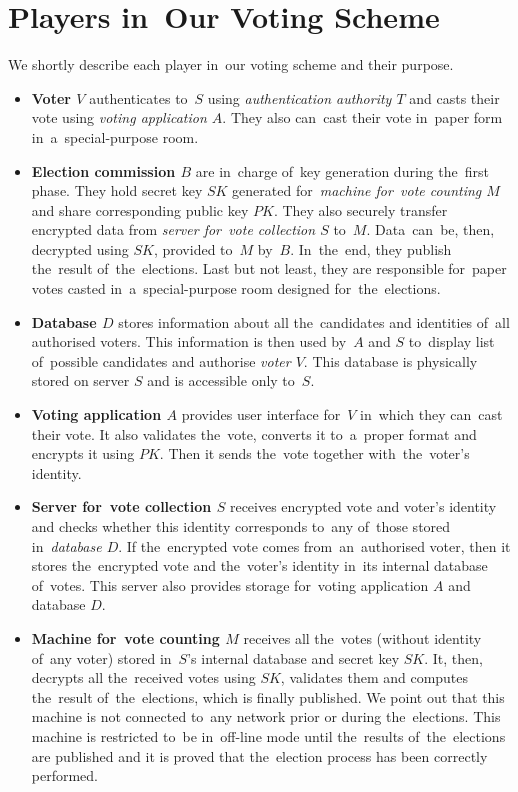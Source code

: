 \section{Players in~Our Voting Scheme}
We shortly describe each player in~our voting scheme and their purpose.
\begin{itemize}
\item \textbf{Voter $V$} authenticates to~$S$ using \emph{authentication authority $T$} and casts their vote using \emph{voting application $A$}. They also can~cast their vote in~paper form in~a~special-purpose room.
\item \textbf{Election commission $B$} are in~charge of~key generation during the~first phase. They hold secret key $SK$ generated for~\emph{machine for~vote counting $M$} and share corresponding public key $PK$. They also securely transfer encrypted data from \emph{server for~vote collection $S$} to~$M$. Data~can~be, then, decrypted using $SK$, provided to~$M$ by~$B$. In~the~end, they publish the~result of~the~elections. Last but not least, they are responsible for~paper votes casted in~a~special-purpose room designed for~the~elections.
\item \textbf{Database $D$} stores information about all the~candidates and identities of~all authorised voters. This information is then used by~$A$ and $S$ to~display list of~possible candidates and authorise \emph{voter $V$}. This database is physically stored on server $S$ and is accessible only to~$S$.
\item \textbf{Voting application $A$} provides user interface for~$V$ in~which they can~cast their vote. It also validates the~vote, converts it to~a~proper format and encrypts it using $PK$. Then it sends the~vote together with~the~voter's identity.
\item \textbf{Server for~vote collection $S$} receives encrypted vote and voter's identity and checks whether this identity corresponds to~any of~those stored in~\emph{database $D$}. If the~encrypted vote comes from~an~authorised voter, then it stores the~encrypted vote and the~voter's identity in~its internal database of~votes. This server also provides storage for~voting application $A$ and database $D$.
\item \textbf{Machine for~vote counting $M$} receives all the~votes (without identity of~any voter) stored in~$S$'s internal database and secret key $SK$. It, then, decrypts all the~received votes using $SK$, validates them and computes the~result of~the~elections, which is finally published. We point out that this machine is not connected to~any network prior or during the~elections. This machine is restricted to~be in~off-line mode until the~results of~the~elections are published and it is proved that the~election process has been correctly performed.

\end{itemize}
